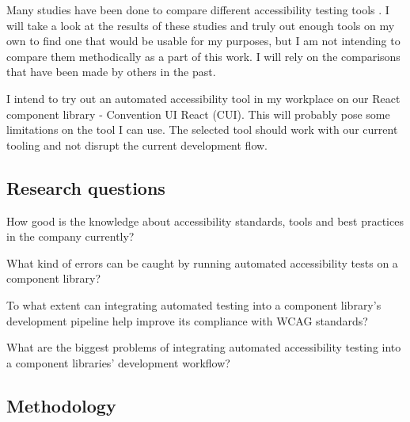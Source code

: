\documentclass{master_thesis}
\begin{document}
Many studies have been done to compare different accessibility testing tools \citep{Alsaeedi2020, Ismailova2022, Sane2021, Vigo2013, RybinKoob2022, Duran2017}. I will take a look at the results of these studies and truly out enough tools on my own to find one that would be usable for my purposes, but I am not intending to compare them methodically as a part of this work. I will rely on the comparisons that have been made by others in the past.

I intend to try out an automated accessibility tool in my workplace on our React component library - Convention UI React (CUI). This will probably pose some limitations on the tool I can use. The selected tool should work with our current tooling and not disrupt the current development flow.

\subsection{Research questions}

	\begin{RQlist}
		\item How good is the knowledge about accessibility standards, tools and best practices in the company currently?
		\item What kind of errors can be caught by running automated accessibility tests on a component library?
		\item To what extent can integrating automated testing into a component library's development pipeline help improve its compliance with WCAG standards?
		\item What are the biggest problems of integrating automated accessibility testing into a component libraries' development workflow?
	\end{RQlist}

\subsection{Methodology}
\end{document}
